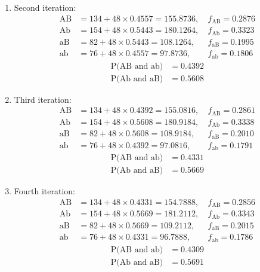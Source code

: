 \documentclass{article}
\begin{document}
\begin{itemize}
\begin{enumerate}
\item Second iteration:
    \begin{align*}
        \text{AB} &= 134 + 48\times 0.4557 = 155.8736, &~ f_{\text{AB}} = 0.2876\\
        \text{Ab} &= 154 + 48\times 0.5443 = 180.1264, &~ f_{\text{Ab}} = 0.3323\\
        \text{aB} &= 82  + 48\times 0.5443 = 108.1264, &~ f_{\text{aB}} = 0.1995\\
        \text{ab} &= 76  + 48\times 0.4557 =  97.8736, &~ f_{\text{ab}} = 0.1806 
    \end{align*}
    \begin{align*}
        \text{P(AB and ab)} &= 0.4392\\
        \text{P(Ab and aB)} &= 0.5608
     \end{align*}
     \item Third iteration:
     \begin{align*}
        \text{AB} &= 134 + 48\times 0.4392 = 155.0816, &~ f_{\text{AB}} = 0.2861\\
        \text{Ab} &= 154 + 48\times 0.5608 = 180.9184, &~ f_{\text{Ab}} = 0.3338\\
        \text{aB} &= 82  + 48\times 0.5608 = 108.9184, &~ f_{\text{aB}} = 0.2010\\
        \text{ab} &= 76  + 48\times 0.4392 =  97.0816, &~ f_{\text{ab}} = 0.1791 
    \end{align*}
    \begin{align*}
        \text{P(AB and ab)} &= 0.4331\\
        \text{P(Ab and aB)} &= 0.5669
    \end{align*}     
\item Fourth iteration:
    \begin{align*}
       \text{AB} &= 134 + 48\times 0.4331 = 154.7888, &~ f_{\text{AB}} = 0.2856\\
       \text{Ab} &= 154 + 48\times 0.5669 = 181.2112, &~ f_{\text{Ab}} = 0.3343\\
       \text{aB} &= 82  + 48\times 0.5669 = 109.2112, &~ f_{\text{aB}} = 0.2015\\
       \text{ab} &= 76  + 48\times 0.4331 =  96.7888, &~ f_{\text{ab}} = 0.1786 
    \end{align*}
    \begin{align*}
        \text{P(AB and ab)} &= 0.4309\\
        \text{P(Ab and aB)} &= 0.5691
    \end{align*}

\end{enumerate}
\end{itemize}
\end{document}
